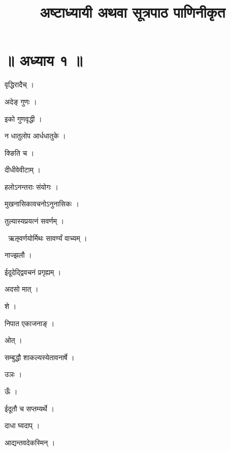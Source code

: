 \documentclass[10pt, openany, oneside]{book}
\title{अष्टाध्यायी अथवा सूत्रपाठ पाणिनीकृत}
\date{}
\begin{document}
\maketitle

\section*{॥ अध्याय १ ॥}

\noindent वृद्धिरादैच् ।

\noindent अदेङ् गुणः ।

\noindent इको गुणवृद्धी ।

\noindent न धातुलोप आर्धधातुके ।

\noindent क्ङिति च ।

\noindent दीधीवेवीटाम् ।

\noindent हलोऽनन्तराः संयोगः ।

\noindent मुखनासिकावचनोऽनुनासिकः ।

\noindent तुल्यास्यप्रयत्नं सवर्णम् ।

\par\noindent\hspace{1.5em}{\vps वा॰}~{\qt ऋऌवर्णयोर्मिथः सावर्ण्यं वाच्यम् ।}

\noindent नाज्झलौ ।

\noindent ईदूदेद्द्विवचनं प्रगृह्यम् ।

\noindent अदसो मात् ।

\noindent शे ।

\noindent निपात एकाजनाङ् ।

\noindent ओत् ।

\noindent सम्बुद्धौ शाकल्यस्येतावनार्षे ।

\noindent उञः ।

\noindent ऊँ ।

\noindent ईदूतौ च सप्तम्यर्थे ।

\noindent दाधा घ्वदाप् ।

\noindent आद्यन्तवदेकस्मिन् ।
\end{document}
